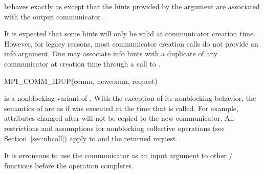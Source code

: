  behaves exactly as
 except that the
hints provided by the argument  are
associated with the output communicator .

\begin{rationale}
It is expected that some hints will only be valid at communicator
creation time. However, for legacy reasons, most communicator creation
calls do not provide an info argument. One may associate info hints
with a duplicate of any communicator at creation time through a call
to .
\end{rationale}

%
\begin{funcdef}{MPI\_COMM\_IDUP}{(\mbox{comm}, \mbox{newcomm}, \mbox{request})}
\end{funcdef}

 is a nonblocking variant of .
With the exception of its nonblocking behavior, the semantics
of  are as if  was executed at the time
that  is called.
For example, attributes changed
after  will not be copied to the new communicator. All
restrictions and assumptions for nonblocking collective
operations (see Section~\ref{sec:nbcoll}) apply to  and
the returned request.

It is erroneous to use the communicator  as an
input argument to other \MPI/ functions before the 
operation completes.


